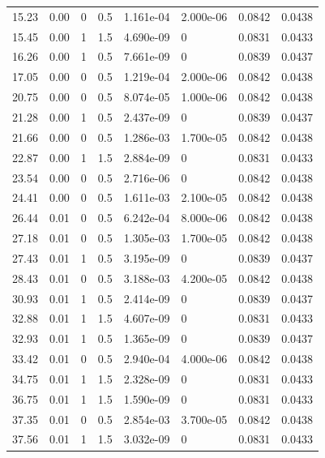 \documentclass[preview]{standalone}
\begin{document}
{{\begin{tabular}{L{1.2cm}C{1.2cm} C{0.3cm}C{0.5cm} C{1.4cm}C{1.4cm} C{1.4cm}C{1.4cm}}
  15.23  &  0.00  & 0     & 0.5 &  1.161e-04  & 2.000e-06  & 0.0842 &  0.0438   \\ 
  15.45  &  0.00  & 1     & 1.5 &  4.690e-09  & 0  & 0.0831 &  0.0433   \\ 
  16.26  &  0.00  & 1     & 0.5 &  7.661e-09  & 0  & 0.0839 &  0.0437   \\ 
  17.05  &  0.00  & 0     & 0.5 &  1.219e-04  & 2.000e-06  & 0.0842 &  0.0438   \\ 
  20.75  &  0.00  & 0     & 0.5 &  8.074e-05  & 1.000e-06  & 0.0842 &  0.0438   \\ 
  21.28  &  0.00  & 1     & 0.5 &  2.437e-09  & 0  & 0.0839 &  0.0437   \\ 
  21.66  &  0.00  & 0     & 0.5 &  1.286e-03  & 1.700e-05  & 0.0842 &  0.0438   \\ 
  22.87  &  0.00  & 1     & 1.5 &  2.884e-09  & 0  & 0.0831 &  0.0433   \\ 
  23.54  &  0.00  & 0     & 0.5 &  2.716e-06  & 0  & 0.0842 &  0.0438   \\ 
  24.41  &  0.00  & 0     & 0.5 &  1.611e-03  & 2.100e-05  & 0.0842 &  0.0438   \\ 
  26.44  &  0.01  & 0     & 0.5 &  6.242e-04  & 8.000e-06  & 0.0842 &  0.0438   \\ 
  27.18  &  0.01  & 0     & 0.5 &  1.305e-03  & 1.700e-05  & 0.0842 &  0.0438   \\ 
  27.43  &  0.01  & 1     & 0.5 &  3.195e-09  & 0  & 0.0839 &  0.0437   \\ 
  28.43  &  0.01  & 0     & 0.5 &  3.188e-03  & 4.200e-05  & 0.0842 &  0.0438   \\ 
  30.93  &  0.01  & 1     & 0.5 &  2.414e-09  & 0  & 0.0839 &  0.0437   \\ 
  32.88  &  0.01  & 1     & 1.5 &  4.607e-09  & 0  & 0.0831 &  0.0433   \\ 
  32.93  &  0.01  & 1     & 0.5 &  1.365e-09  & 0  & 0.0839 &  0.0437   \\ 
  33.42  &  0.01  & 0     & 0.5 &  2.940e-04  & 4.000e-06  & 0.0842 &  0.0438   \\ 
  34.75  &  0.01  & 1     & 1.5 &  2.328e-09  & 0  & 0.0831 &  0.0433   \\ 
  36.75  &  0.01  & 1     & 1.5 &  1.590e-09  & 0  & 0.0831 &  0.0433   \\ 
  37.35  &  0.01  & 0     & 0.5 &  2.854e-03  & 3.700e-05  & 0.0842 &  0.0438   \\ 
  37.56  &  0.01  & 1     & 1.5 &  3.032e-09  & 0  & 0.0831 &  0.0433   \\ 

\end{tabular}}}
\end{document}
